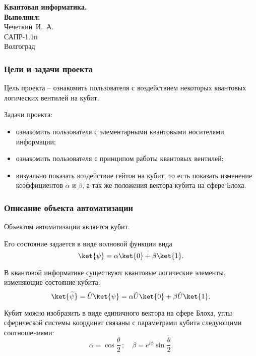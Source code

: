\documentclass[12pt,pdf]{beamer}
\renewcommand{\~}[1]{\widetilde{#1}}
\begin{document}
  \begin{frame}
    \begin{center}
    \vspace{3.0cm}
    \normalsize
    \textbf{Квантовая информатика.} \\
    \vspace{1.5cm}
    \raggedleft\small\textbf{Выполнил:}\\Чечеткин~И.~А.\\САПР-1.1п\\
    \vspace{1.8cm}
    \vspace{\fill}
    \centering Волгоград \the\year
    \end{center}
  \end{frame}

  \begin{frame}
    \frametitle{Цели и задачи проекта}
    Цель проекта -- ознакомить пользователя с воздействием некоторых квантовых
    логических вентилей на кубит.
    \vspace{1ex}
    
    Задачи проекта:
    \begin{itemize}
      \item ознакомить пользователя с элементарными квантовыми носителями
        информации;
      \item ознакомить пользователя с принципом работы квантовых вентилей;
      \item визуально показать воздействие гейтов на кубит, то есть показать
        изменение коэффициентов \( \alpha \) и \( \beta \), а так же положения
        вектора кубита на сфере Блоха.
    \end{itemize}
  \end{frame}

  \begin{frame}
    \frametitle{Описание объекта автоматизации}
    Объектом автоматизации является кубит.
    
    Его состояние задается в виде волновой функции вида
    \[
    	\ket{\psi} = \alpha\ket{0} + \beta\ket{1}.
    \]
    
    В квантовой информатике существуют квантовые логические элементы,
    изменяющие состояние кубита:
    \[
      \ket{\~{\psi}} = \hat{U}\ket{\psi} = \alpha\hat{U}\ket{0} +
        \beta\hat{U}\ket{1}.
    \]
    
    Кубит можно изобразить в виде единичного вектора на сфере Блоха, углы
    сферической системы координат связаны с параметрами кубита следующими
    соотношениями:
    \[
      \alpha = \cos\frac{\theta}{2}\,; \quad
      \beta = e^{i\phi}\sin\frac{\theta}{2}.
    \]
  \end{frame}
\end{document}
